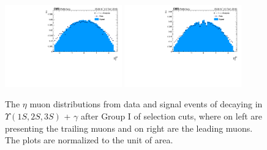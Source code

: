 \begin{figure}[!htbp]
\begin{center}
\includegraphics[width=0.45\textwidth]{figures/outputPlots/ZtoUpsilon_Cat0_ZZZZZ/au/data_x_mc/noKinCuts/h_noKin_TrailingMu_eta}\hspace*{1.cm}
\includegraphics[width=0.45\textwidth]{figures/outputPlots/ZtoUpsilon_Cat0_ZZZZZ/au/data_x_mc/noKinCuts/h_noKin_LeadingMu_eta}
\end{center}\vspace*{-.5cm}
\caption{The $\eta$ muon distributions from data and signal events of \Z decaying in $\Upsilon(1S,2S,3S)$ + $\gamma$ after Group I of selection cuts, where on left are presenting the trailing muons and on right are the leading muons. The plots are normalized to the unit of area.}
\label{fig:etaMuons_ZtoUpsilon_Cat0}
\end{figure}

